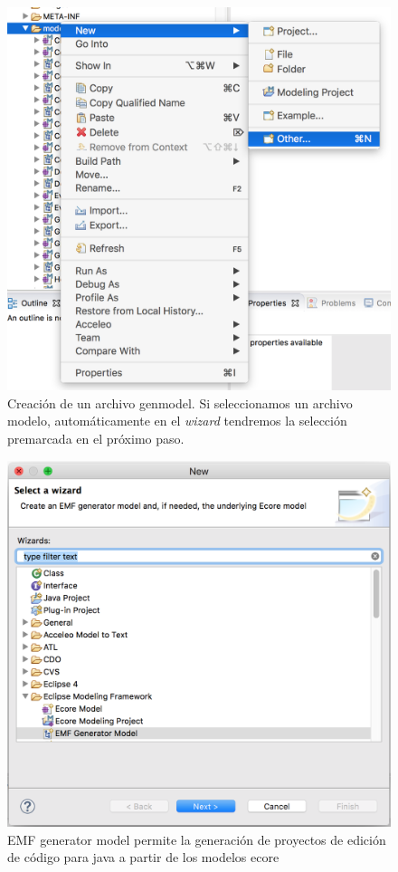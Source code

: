 \begin{figure}
    \centering
    \includegraphics[scale=0.4]{images/emf_capturas/genmodel_1.png}
    \sourcepropia{}
    \caption[Creación de un archivo genmodel, paso 1]{Creación de un archivo genmodel. Si seleccionamos un archivo modelo, automáticamente en el \textit{wizard} tendremos la selección premarcada en el próximo paso.}
    \label{fig:modelo_genmodel_paso1}
\end{figure}

\begin{figure}
    \centering
    \includegraphics[scale=0.4]{images/emf_capturas/genmodel_2.png}
    \sourcepropia{}
    \caption[Creación de un archivo genmodel desde \gls{ecore}, paso 2]{EMF generator model permite la generación de proyectos de edición de código para java a partir de los modelos \gls{ecore}}
    \label{fig:modelo_genmodel_paso2}
\end{figure}

